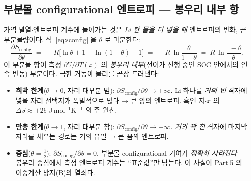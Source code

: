 \documentclass[11pt,a4paper]{article}
\newcommand{\cfg}{\mathrm{config}}
\begin{document}
\subsection{부분몰 configurational 엔트로피 — 봉우리 내부 항}\label{sec:partial_molar}
가역 발열$\cdot$엔트로피 계수에 들어가는 것은 \emph{Li 한 몰을 더 넣을 때} 엔트로피의 변화, 곧 부분몰량이다.
식~\eqref{eq:sconfig} 을 $\theta$ 로 미분한다:
\begin{equation}
\boxed{\;
\frac{\partial S_\cfg}{\partial\theta}
   \;=\; -R\big[\ln\theta + 1 - \ln(1-\theta) - 1\big]
   \;=\; -R\,\ln\frac{\theta}{1-\theta}
   \;=\; R\,\ln\frac{1-\theta}{\theta}.
\;}
\label{eq:partial_sconfig}
\end{equation}
이 부분몰 항이 측정 $\partial U/\partial T(x)$ 의 \emph{봉우리 내부}(전이가 진행 중인 SOC 안에서의 연속
변동) 부분이다. 극한 거동이 물리를 곧장 드러낸다:
\begin{itemize}[leftmargin=1.6em,itemsep=2pt]
\item \textbf{희박 한계}($\theta\to0$, 자리 대부분 빔): $\partial S_\cfg/\partial\theta\to+\infty$. Li
하나를 \emph{거의 빈} 격자에 넣을 자리 선택지가 폭발적으로 많다 → 큰 양의 엔트로피. 흑연 저-$x$ 의
$\Delta S\approx+29$ J\,mol$^{-1}$K$^{-1}$ \cite{allart2018} 의 주 원천.
\item \textbf{만충 한계}($\theta\to1$, 자리 대부분 참): $\partial S_\cfg/\partial\theta\to-\infty$. \emph{거의
꽉 찬} 격자에 마지막 자리를 채우는 경로는 거의 유일 → 큰 음의 엔트로피.
\item \textbf{중심}($\theta=\tfrac12$): $\partial S_\cfg/\partial\theta=0$. 부분몰 configurational 기여가
\emph{정확히 사라진다} — 봉우리 중심에서 측정 엔트로피 계수는 ``표준값''만 남는다. 이 사실이 Part 5 의
이중계산 방지(B)의 열쇠다.
\end{itemize}
\end{document}
